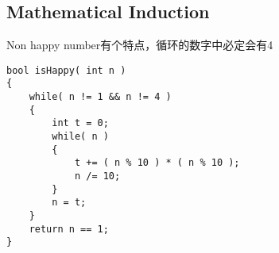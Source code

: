 \subsection{Mathematical Induction}
\begin{CJK*}{UTF8}{gbsn}
Non happy number有个特点，循环的数字中必定会有4
\end{CJK*}
\begin{lstlisting}[style=customc, caption={Mathematical Induction}]
bool isHappy( int n )
{
    while( n != 1 && n != 4 )
    {
        int t = 0;
        while( n )
        {
            t += ( n % 10 ) * ( n % 10 );
            n /= 10;
        }
        n = t;
    }
    return n == 1;
}
\end{lstlisting}